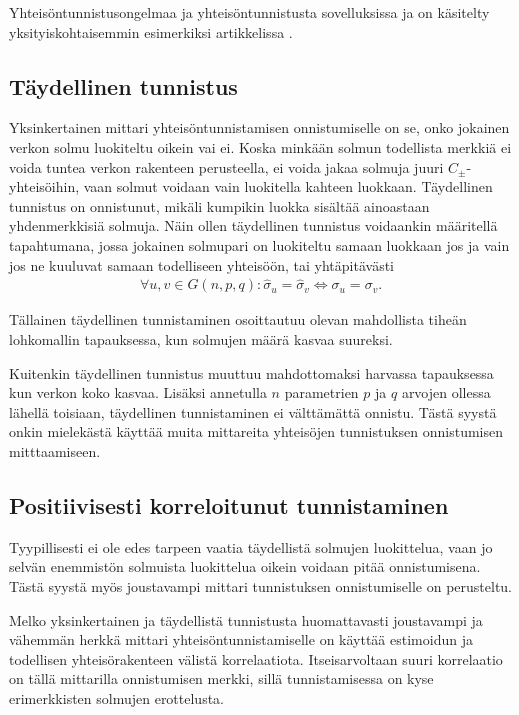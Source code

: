 \documentclass[finnish,12pt,a4paper,pdftex,sci,utf8]{aaltothesis}
\begin{document}
Yhteisöntunnistusongelmaa ja yhteisöntunnistusta sovelluksissa ja on käsitelty yksityiskohtaisemmin esimerkiksi artikkelissa \cite{Fortunato}.

\subsection{Täydellinen tunnistus}

Yksinkertainen mittari yhteisöntunnistamisen onnistumiselle on se, onko jokainen verkon solmu luokiteltu oikein vai ei. Koska minkään solmun todellista merkkiä ei voida tuntea verkon rakenteen perusteella, ei voida jakaa solmuja juuri $C_{\pm}$-yhteisöihin, vaan solmut voidaan vain luokitella kahteen luokkaan. Täydellinen tunnistus on onnistunut, mikäli kumpikin luokka sisältää ainoastaan yhdenmerkkisiä solmuja. Näin ollen täydellinen tunnistus voidaankin määritellä tapahtumana, jossa jokainen solmupari on luokiteltu samaan luokkaan jos ja vain jos ne kuuluvat samaan todelliseen yhteisöön, tai yhtäpitävästi
\begin{align*}
	\forall u,v \in G(n,p,q) : \hat{\sigma}_u = \hat{\sigma}_v \Leftrightarrow \sigma_u = \sigma_v.
\end{align*}

Tällainen täydellinen tunnistaminen osoittautuu olevan mahdollista tiheän lohkomallin tapauksessa, kun solmujen määrä kasvaa suureksi.

Kuitenkin täydellinen tunnistus muuttuu mahdottomaksi harvassa tapauksessa kun verkon koko kasvaa. Lisäksi annetulla $n$ parametrien $p$ ja $q$ arvojen ollessa lähellä toisiaan, täydellinen tunnistaminen ei välttämättä onnistu. Tästä syystä onkin mielekästä käyttää muita mittareita yhteisöjen tunnistuksen onnistumisen mitttaamiseen.

\subsection{Positiivisesti korreloitunut tunnistaminen}
Tyypillisesti ei ole edes tarpeen vaatia täydellistä solmujen luokittelua, vaan jo selvän enemmistön solmuista luokittelua oikein voidaan pitää onnistumisena. Tästä syystä myös joustavampi mittari tunnistuksen onnistumiselle on perusteltu.

Melko yksinkertainen ja täydellistä tunnistusta huomattavasti joustavampi ja vähemmän herkkä mittari yhteisöntunnistamiselle on käyttää estimoidun ja todellisen yhteisörakenteen välistä korrelaatiota. Itseisarvoltaan suuri korrelaatio on tällä mittarilla onnistumisen merkki, sillä tunnistamisessa on kyse erimerkkisten solmujen erottelusta.
\end{document}
